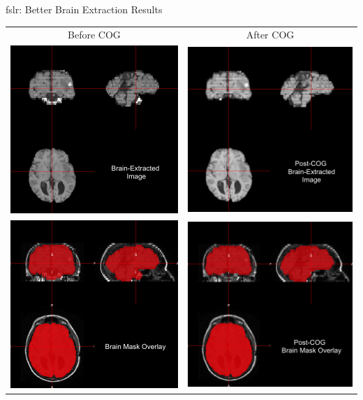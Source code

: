 \documentclass[11pt]{beamer}\usepackage[]{graphicx}\usepackage[]{color}
\begin{document}
\begin{frame}[fragile]{fslr: Better Brain Extraction Results}

\begin{tabular}{cc}
Before COG & After COG \\
\includegraphics[width=0.4\linewidth]{BET_Image.png} & \includegraphics[width=0.4\linewidth]{BET_Image2.png} \\
\includegraphics[width=0.4\linewidth]{BET_Image_Overlay.png} & \includegraphics[width=0.4\linewidth]{BET_Image_Overlay2.png}
\end{tabular}

\end{frame}
\end{document}
